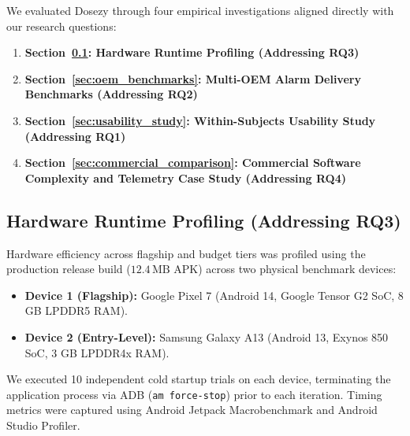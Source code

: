 \documentclass[11pt,a4paper]{article}
\begin{document}
We evaluated Dosezy through four empirical investigations aligned directly with our research questions:
\begin{enumerate}
    \item \textbf{Section~\ref{sec:runtime_profiling}: Hardware Runtime Profiling (Addressing RQ3)}
    \item \textbf{Section~\ref{sec:oem_benchmarks}: Multi-OEM Alarm Delivery Benchmarks (Addressing RQ2)}
    \item \textbf{Section~\ref{sec:usability_study}: Within-Subjects Usability Study (Addressing RQ1)}
    \item \textbf{Section~\ref{sec:commercial_comparison}: Commercial Software Complexity and Telemetry Case Study (Addressing RQ4)}
\end{enumerate}

\subsection{Hardware Runtime Profiling (Addressing RQ3)}
\label{sec:runtime_profiling}

Hardware efficiency across flagship and budget tiers was profiled using the production release build ($12.4\,\text{MB}$ APK) across two physical benchmark devices:
\begin{itemize}[leftmargin=*]
    \item \textbf{Device 1 (Flagship):} Google Pixel 7 (Android 14, Google Tensor G2 SoC, 8 GB LPDDR5 RAM).
    \item \textbf{Device 2 (Entry-Level):} Samsung Galaxy A13 (Android 13, Exynos 850 SoC, 3 GB LPDDR4x RAM).
\end{itemize}

We executed 10 independent cold startup trials on each device, terminating the application process via ADB (\texttt{am force-stop}) prior to each iteration. Timing metrics were captured using Android Jetpack Macrobenchmark and Android Studio Profiler.
\end{document}
